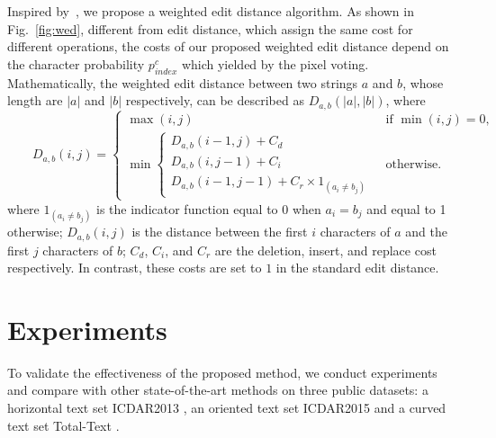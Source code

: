 \documentclass[runningheads]{llncs}
\begin{document}
Inspired by~\cite{yao2014unified}, we propose a weighted edit distance algorithm. As shown in Fig.~\ref{fig:wed}, different from edit distance,  which assign the same cost for different operations, the costs of our proposed weighted edit distance depend on the character probability $p_{index}^c$ which yielded by the pixel voting. Mathematically, the weighted edit distance between two strings $a$ and $b$, whose length are $|a|$ and $|b|$ respectively, can be described as $D_{a,b}(|a|,|b|)$, where
\begin{equation}
{\qquad D_{a,b}(i,j)={\begin{cases}\max(i,j)&{\text{ if }}\min(i,j)=0,\\\min {\begin{cases} D_{a,b}(i-1,j)+C_d\\ D_{a,b}(i,j-1)+C_i\\ D_{a,b}(i-1,j-1)+C_r \times 1_{(a_{i}\neq b_{j})}\end{cases}}&{\text{ otherwise.}}\end{cases}}}
\end{equation}
where $1_{(a_{i}\neq b_{j})}$ is the indicator function equal to 0 when $a_{i}=b_{j}$ and equal to 1 otherwise; $D_{a,b}(i,j)$ is the distance between the first $i$ characters of $a$ and the first $j$ characters of $b$; $C_d$, $C_i$, and $C_r$ are the deletion, insert, and replace cost respectively. In contrast, these costs are set to $1$ in the standard edit distance.


\section{Experiments}

To validate the effectiveness of the proposed method, we conduct experiments and compare with other state-of-the-art methods on three public datasets: a horizontal text set ICDAR2013 \cite{karatzas2013icdar}, an oriented text set ICDAR2015 \cite{karatzas2015icdar} and a curved text set Total-Text \cite{CK2017}.
\end{document}
